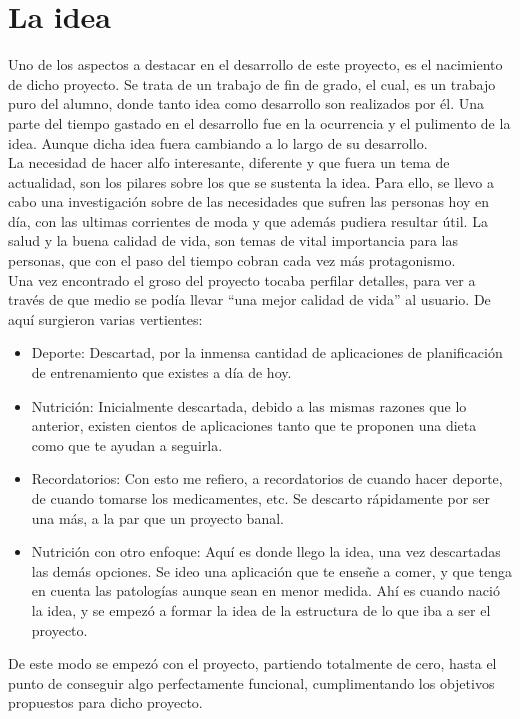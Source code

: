 
\section{La idea}
Uno de los aspectos a destacar en el desarrollo de este proyecto, es el nacimiento de dicho proyecto. Se trata de un trabajo de fin de grado, el cual, es un trabajo puro del alumno, donde tanto idea como desarrollo son realizados por él. Una parte del tiempo gastado en el desarrollo fue en la ocurrencia y el pulimento de la idea. Aunque dicha idea fuera cambiando a lo largo de su desarrollo.\\

La necesidad de hacer alfo interesante, diferente y que fuera un tema de actualidad, son los pilares sobre los que se sustenta la idea. Para ello, se llevo a cabo una investigación sobre de las necesidades que sufren las personas hoy en día, con las ultimas corrientes de moda y que además pudiera resultar útil. La salud y la buena calidad de vida, son temas de vital importancia para las personas, que con el paso del tiempo cobran cada vez más protagonismo.\\

Una vez encontrado el groso del proyecto tocaba perfilar detalles, para ver a través de que medio se podía llevar “una mejor calidad de vida” al usuario. De aquí surgieron varias vertientes:\\

\begin{itemize}
\item	Deporte: Descartad, por la inmensa cantidad de aplicaciones de planificación de entrenamiento que existes a día de hoy.
\item	Nutrición: Inicialmente descartada, debido a las mismas razones que lo anterior, existen cientos de aplicaciones tanto que te proponen una dieta como que te ayudan a seguirla.
\item	Recordatorios: Con esto me refiero, a recordatorios de cuando hacer deporte, de cuando tomarse los medicamentes, etc. Se descarto rápidamente por ser una más, a la par que un proyecto banal.
\item	Nutrición con otro enfoque: Aquí es donde llego la idea, una vez descartadas las demás opciones. Se ideo  una aplicación que te enseñe a comer, y que tenga en cuenta las patologías aunque sean en menor medida. Ahí es cuando nació la idea, y se empezó a formar la idea de la estructura de lo que iba a ser el proyecto.

\end{itemize}
De este modo se empezó con el proyecto, partiendo totalmente de cero, hasta el punto de conseguir algo perfectamente funcional, cumplimentando los objetivos propuestos para dicho proyecto.

